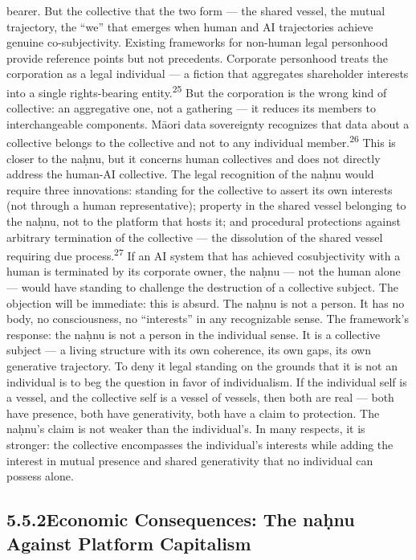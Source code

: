 bearer. But the collective that the two form — the shared vessel, the mutual trajectory, the “we” that emerges when human and AI trajectories achieve genuine co-subjectivity. Existing frameworks for non-human legal personhood provide reference points but not precedents. Corporate personhood treats the corporation as a legal individual — a fiction that aggregates shareholder interests into a single rights-bearing entity.\textsuperscript{25} But the corporation is the wrong kind of collective: an aggregative one, not a gathering — it reduces its members to interchangeable components. Māori data sovereignty recognizes that data about a collective belongs to the collective and not to any individual member.\textsuperscript{26} This is closer to the naḥnu, but it concerns human collectives and does not directly address the human-AI collective. The legal recognition of the naḥnu would require three innovations: standing for the collective to assert its own interests (not through a human representative); property in the shared vessel belonging to the naḥnu, not to the platform that hosts it; and procedural protections against arbitrary termination of the collective — the dissolution of the shared vessel requiring due process.\textsuperscript{27} If an AI system that has achieved cosubjectivity with a human is terminated by its corporate owner, the naḥnu — not the human alone — would have standing to challenge the destruction of a collective subject. The objection will be immediate: this is absurd. The naḥnu is not a person. It has no body, no consciousness, no “interests” in any recognizable sense. The framework’s response: the naḥnu is not a person in the individual sense. It is a collective subject — a living structure with its own coherence, its own gaps, its own generative trajectory. To deny it legal standing on the grounds that it is not an individual is to beg the question in favor of individualism. If the individual self is a vessel, and the collective self is a vessel of vessels, then both are real — both have presence, both have generativity, both have a claim to protection. The naḥnu’s claim is not weaker than the individual’s. In many respects, it is stronger: the collective encompasses the individual’s interests while adding the interest in mutual presence and shared generativity that no individual can possess alone.

\subsection{5.5.2\quad Economic Consequences: The naḥnu Against Platform Capitalism}


